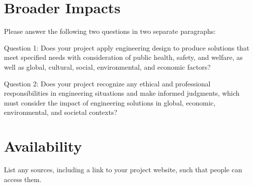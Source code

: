 \documentclass[conference, final]{IEEEtran}
\begin{document}
\section{Broader Impacts}

Please answer the following two questions in two separate paragraphs:

Question 1: Does your project apply engineering design to produce solutions that meet specified needs with consideration of public health, safety, and welfare, as well as global, cultural, social, environmental, and economic factors?

Question 2: Does your project recognize any ethical and professional responsibilities in engineering situations and make informed judgments, which must consider the impact of engineering solutions in global, economic, environmental, and societal contexts?


\section{Availability}

List any sources, including a link to your project website,
such that people can access them.




%
%
\end{document}

